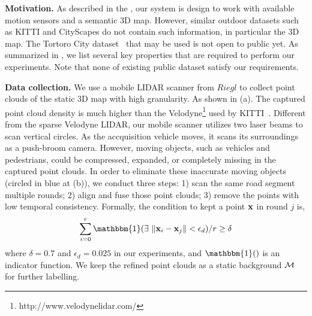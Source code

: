 \textbf{Motivation.}
As described in the , our system is design to work with available motion sensors and a semantic 3D map.
However, similar outdoor datasets such as KITTI and CityScapes do not contain such information, in particular the 3D map. The Tortoro City dataset~\cite{wang2016torontocity} that may be used is not open to public yet. As summarized in , we list several key properties that are required to perform our experiments.
Note that none of existing public dataset satisfy our requirements.

\textbf{Data collection.}
We use a mobile LIDAR scanner from $Riegl$ to collect point clouds of the static 3D map with high granularity. As shown in (a). The captured point cloud density is much higher than the Velodyne\footnote{http://www.velodynelidar.com/} used by KITTI~\cite{geiger2012we}.
Different from the sparse Velodyne LIDAR, our mobile scanner utilizes two laser beams to scan vertical circles. As the accquisition vehicle moves, it scans its surroundings as a push-broom camera. However, moving objects, such as vehicles and pedestrians, could be compressed, expanded, or completely missing in the captured point clouds.
In order to eliminate these inaccurate moving objects (circled in blue at (b)), we conduct three steps:
1) scan the same road segment multiple rounds; 2) align and fuse those point clouds; 3) remove the points with low temporal consistency.
Formally, the condition to kept a point ${\mathbf x}$ in round $j$ is,
{\vspace{-0.5\baselineskip}
\begin{align}
\sum_{i=0}^{r}{\mathbbm{1}(\exists~\|\ve{x}_i - \ve{x}_j\| < \epsilon_d )} / r \geq \delta
\end{align}
}
where $\delta = 0.7$ and $\epsilon_d = 0.025$ in our experiments, and $\mathbbm{1}()$ is an indicator function. 
We keep the refined point clouds as a static background ${\mathcal M}$ for further labelling.

